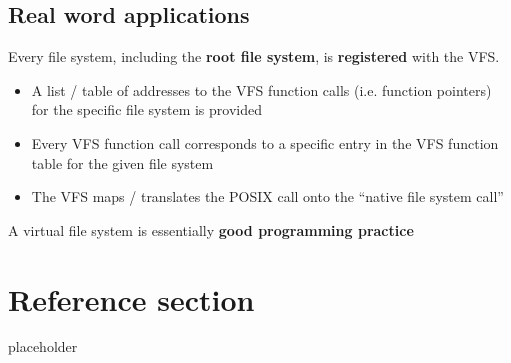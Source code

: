 \documentclass{article}
\begin{document}
\subsection{Real word applications}
\begin{flushleft}
Every file system, including the \textbf{root file system}, is \textbf{registered} with the VFS.
\begin{itemize}
	\item A list / table of addresses to the VFS function calls (i.e. function pointers) for the specific file system is provided
	\item Every VFS function call corresponds to a specific entry in the VFS function table for the given file system
	\item The VFS maps / translates the POSIX call onto the “native file system call” 
\end{itemize}
A virtual file system is essentially \textbf{good programming practice}
\end{flushleft}

\pagebreak
\section*{Reference section} \label{sec:reference}
\begin{description}
	\item[placeholder] \hfill \\
\end{description}
\end{document}
